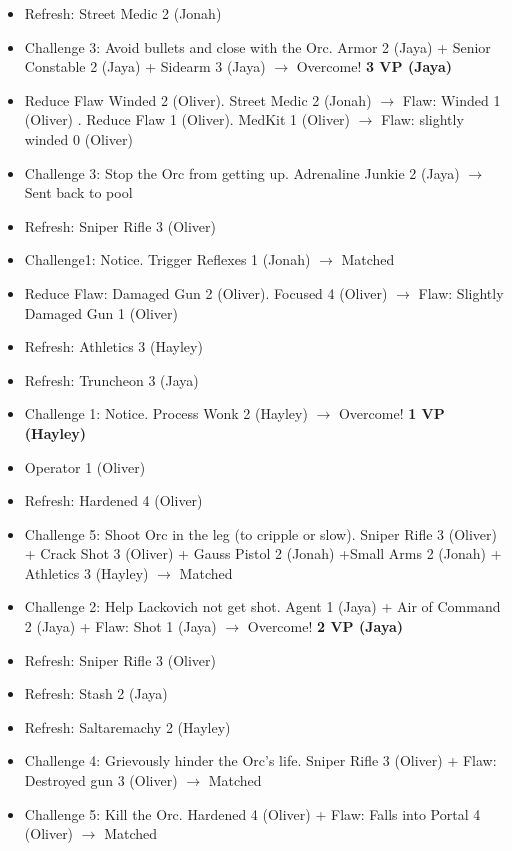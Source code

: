 \begin{itemize}
\item Refresh: Street Medic 2 (Jonah)
\item Challenge 3: Avoid bullets and close with the Orc.  Armor 2 (Jaya) + Senior Constable 2 (Jaya) + Sidearm 3 (Jaya)  $\rightarrow$ Overcome! \textbf{3 VP (Jaya)}
\item Reduce Flaw Winded 2 (Oliver).  Street Medic 2 (Jonah) $\rightarrow$ Flaw: Winded 1 (Oliver) {\color[RGB]{255,0,0}. }  Reduce Flaw 1 (Oliver).  MedKit 1 (Oliver) $\rightarrow$  {\color[RGB]{255,0,0}Flaw: slightly winded 0 (Oliver)} 
\item Challenge 3: Stop the Orc from getting up.  Adrenaline Junkie 2 (Jaya) $\rightarrow$ Sent back to pool
\item Refresh: Sniper Rifle 3 (Oliver)
\item Challenge1:  Notice.  Trigger Reflexes 1 (Jonah) $\rightarrow$ Matched
\item Reduce Flaw: Damaged Gun 2 (Oliver).  Focused 4 (Oliver) $\rightarrow$  {\color[RGB]{255,0,0}Flaw: Slightly Damaged Gun 1 (Oliver)} 
\item Refresh: Athletics 3 (Hayley)
\item Refresh: Truncheon 3 (Jaya)
\item Challenge 1: Notice.  Process Wonk 2 (Hayley)   $\rightarrow$ Overcome! \textbf{1 VP (Hayley)}
\item Operator 1 (Oliver)
\item Refresh: Hardened 4 (Oliver)
\item Challenge 5: Shoot Orc in the leg (to cripple or slow).  Sniper Rifle 3 (Oliver) + Crack Shot 3 (Oliver) + Gauss Pistol 2 (Jonah) +Small Arms 2 (Jonah) + Athletics 3 (Hayley)  $\rightarrow$ Matched
\item Challenge 2: Help Lackovich not get shot.  Agent 1  (Jaya) + Air of Command 2  (Jaya) + Flaw: Shot 1 (Jaya)  $\rightarrow$ Overcome! \textbf{2 VP (Jaya)}
\item Refresh: Sniper Rifle 3 (Oliver)
\item Refresh: Stash 2 (Jaya)
\item Refresh: Saltaremachy 2 (Hayley)
\item Challenge 4: Grievously hinder the Orc's life.  Sniper Rifle 3 (Oliver) +  {\color[RGB]{255,0,0}Flaw: Destroyed gun 3 (Oliver) } $\rightarrow$ Matched
\item Challenge 5: Kill the Orc.  Hardened 4 (Oliver) +  {\color[RGB]{255,0,0}Flaw: Falls into Portal 4 (Oliver) } $\rightarrow$ Matched

\end{itemize}
